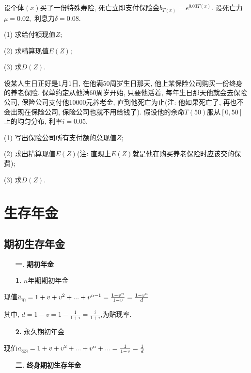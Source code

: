 \documentclass[a4paper,10pt]{ctexbook}
\makeatletter
\newcommand{\hei}{\CJKfamily{hei}}      %
\DeclareRobustCommand{\annu}[1]{_{%
    \def\arraystretch{0}%
    \setlength\arraycolsep{1pt}%
    \setlength\arrayrulewidth{.2pt}%
    \begin{array}[b]{@{}c|}\hline
        \\[\arraycolsep]%
        \scriptstyle #1%
    \end{array}%
}}
\makeatother
\begin{document}
\begin{exs}
    设个体$(x)$买了一份特殊寿险, 死亡立即支付保险金$b_{T(x)}=e^{0.03T(x)}.$ 设死亡力$\mu=0.02,$ 利息力$\delta=0.08.$

    (1) 求给付额现值$Z;$

    (2) 求精算现值$E(Z);$

    (3) 求$D(Z).$
\end{exs}

\begin{exs}
    设某人生日正好是$1$月$1$日, 在他满$50$周岁生日那天, 他上某保险公司购买一份终身的养老保险. 保单约定从他满$60$周岁开始, 只要他活着, 每年生日那天他就会去保险公司, 保险公司支付他$10000$元养老金, 直到他死亡为止(注: 他如果死亡了, 再也不会出现在保险公司, 保险公司也就不用给钱了). 假设他的余命$T(50)$服从$[0,50]$上的均匀分布, 利率$i=0.05.$

    (1) 写出保险公司所有支付额的总现值$Z$;

    (2) 求出精算现值$E(Z)$(注: 直观上$E(Z)$就是他在购买养老保险时应该交的保费);

    (3) 求$D(Z).$
\end{exs}

\chapter{生存年金}
\section{期初生存年金}
\begin{itemize}
    \item[{\bf\hei 一.}]{\bf\hei 期初年金}
\end{itemize}

\begin{itemize}
    \item[{\bf\hei 1.}]$n$年期期初年金
\end{itemize}

现值$\ddot a_{\annu n}=1+v+v^2+...+v^{n-1}=\frac{1-v^n}{1-v}=\frac{1-v^n}{d}$

其中, $d=1-v=1-\frac{1}{1+i}=\frac{i}{1+i}$,为贴现率.
\begin{itemize}
    \item[{\bf\hei 2.}]永久期初年金
\end{itemize}

现值$a_{\annu {\infty}}=1+v+v^2+...+v^n+...=\frac{1}{1-v}=\frac{1}{d}$
\begin{itemize}
    \item[{\bf\hei 二.}]{\bf\hei 终身期初生存年金}
\end{itemize}
\end{document}
